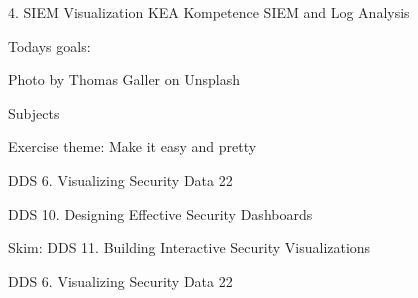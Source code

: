 \documentclass[Screen16to9,17pt]{foils}
\begin{document}
\mytitlepage
{4. SIEM Visualization}
{KEA Kompetence SIEM and Log Analysis}




Todays goals:
\begin{list2}
  \item\end{list2}

  Photo by Thomas Galler on Unsplash



\begin{list1}
\item Subjects
\begin{list2}
\item
\end{list2}
\item Exercise theme: Make it easy and pretty
\begin{list2}
\item
\end{list2}
\end{list1}


\begin{list1}
\item DDS 6. Visualizing Security Data 22
\item DDS 10. Designing Effective Security Dashboards
\item Skim: DDS 11. Building Interactive Security Visualizations
\end{list1}





\begin{quote}

\end{quote}

\begin{list1}
\item   DDS 6. Visualizing Security Data 22
\begin{list2}
\item
\end{list2}
\end{list1}



\begin{quote}

\end{quote}
\end{document}
